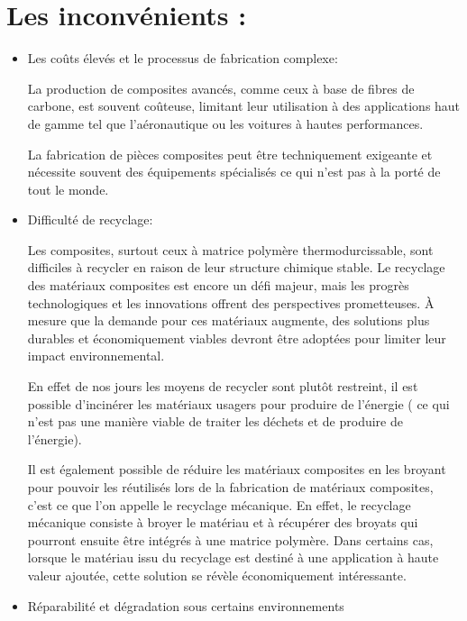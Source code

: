 \section{Les inconvénients :}

\begin{itemize}

    \item
    Les coûts élevés et le processus de fabrication complexe:


    La production de composites avancés, comme ceux à base de fibres de carbone, est souvent coûteuse, limitant leur utilisation à des applications haut de gamme tel que l’aéronautique ou les voitures à hautes performances.


    La fabrication de pièces composites peut être techniquement exigeante et nécessite souvent des équipements spécialisés ce qui n’est pas à la porté de tout le monde.




    \item
    Difficulté de recyclage:


    Les composites, surtout ceux à matrice polymère thermodurcissable, sont difficiles à recycler en raison de leur structure chimique stable.
    Le recyclage des matériaux composites est encore un défi majeur, mais les progrès technologiques et les innovations offrent des perspectives prometteuses.
    À mesure que la demande pour ces matériaux augmente, des solutions plus durables et économiquement viables devront être adoptées pour limiter leur impact environnemental.


    En effet de nos jours les moyens de recycler sont plutôt restreint, il est possible d’incinérer les matériaux usagers pour produire de l’énergie ( ce qui n’est pas une manière viable de traiter les déchets et de produire de l’énergie).


    Il est également possible de réduire les matériaux composites en les broyant pour pouvoir les réutilisés lors de la fabrication de matériaux composites, c’est ce que l’on appelle le recyclage mécanique.
    En effet, le recyclage mécanique consiste à broyer le matériau et à récupérer des broyats qui pourront ensuite être intégrés à une matrice polymère.
    Dans certains cas, lorsque le matériau issu du recyclage est destiné à une application à haute valeur ajoutée, cette solution se révèle économiquement intéressante.




\item
Réparabilité et dégradation sous certains environnements



\end{itemize}
